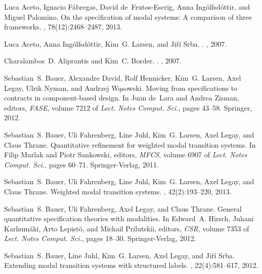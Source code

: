 \documentclass[twocolumn]{svjour3-dummy}
\begin{document}
\begin{thebibliography}{10}

Luca Aceto, Ignacio F{\'a}bregas, David de~Frutos-Escrig, Anna
  Ing{\'o}lfsd{\'o}ttir, and Miguel Palomino.
\newblock On the specification of modal systems: A comparison of three
  frameworks.
, 78(12):2468--2487, 2013.

Luca Aceto, Anna Ing{\'o}lfsd{\'o}ttir, Kim~G. Larsen, and Ji{\v r}{\'i} Srba.
.
, 2007.

Charalambos~D. Aliprantis and Kim~C. Border.
.
, 2007.

Sebastian~S. Bauer, Alexandre David, Rolf Hennicker, Kim~G. Larsen, Axel Legay,
  Ulrik Nyman, and Andrzej {W{\k a}sowski}.
\newblock Moving from specifications to contracts in component-based design.
\newblock In Juan de~Lara and Andrea Zisman, editors, {\em FASE}, volume 7212
  of {\em {Lect. Notes Comput. Sci.}}, pages 43--58. Springer, 2012.

Sebastian~S. Bauer, Uli Fahrenberg, Line Juhl, Kim~G. Larsen, Axel Legay, and
  Claus Thrane.
\newblock Quantitative refinement for weighted modal transition systems.
\newblock In Filip Murlak and Piotr Sankowski, editors, {\em MFCS}, volume 6907
  of {\em {Lect. Notes Comput. Sci.}}, pages 60--71. {Springer-Verlag}, 2011.

Sebastian~S. Bauer, Uli Fahrenberg, Line Juhl, Kim~G. Larsen, Axel Legay, and
  Claus Thrane.
\newblock Weighted modal transition systems.
, 42(2):193--220, 2013.

Sebastian~S. Bauer, Uli Fahrenberg, Axel Legay, and Claus Thrane.
\newblock General quantitative specification theories with modalities.
\newblock In Edward~A. Hirsch, Juhani Karhum{\"a}ki, Arto Lepist{\"o}, and
  Michail Prilutskii, editors, {\em CSR}, volume 7353 of {\em {Lect. Notes
  Comput. Sci.}}, pages 18--30. {Springer-Verlag}, 2012.

Sebastian~S. Bauer, Line Juhl, Kim~G. Larsen, Axel Legay, and Ji{\v r}{\'i}
  Srba.
\newblock Extending modal transition systems with structured labels.
, 22(4):581--617, 2012.


\end{thebibliography}
\end{document}
